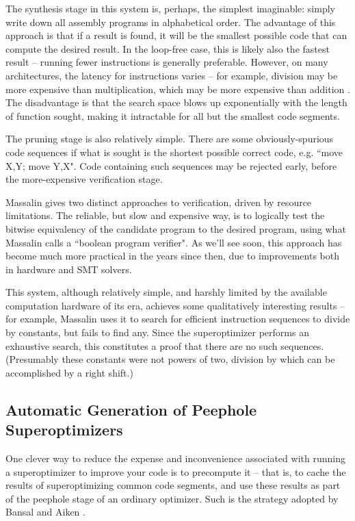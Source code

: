 \documentclass[12pt,twoside]{reedthesis}
\begin{document}
            The synthesis stage in this system is, perhaps, the simplest imaginable: simply write down all assembly programs in alphabetical order.
            The advantage of this approach is that if a result is found, it will be the smallest possible code that can compute the desired result.
            In the loop-free case, this is likely also the fastest result -- running fewer instructions is generally preferable.
            However, on many architectures, the latency for instructions varies -- for example, division may be more expensive than multiplication, which may be more expensive than addition \cite{fog2022instructiontables}.
            The disadvantage is that the search space blows up exponentially with the length of function sought, making it intractable for all but the smallest code segments.
                
            The pruning stage is also relatively simple.
            There are some obviously-spurious code sequences if what is sought is the shortest possible correct code, e.g. ``move X,Y; move Y,X".
            Code containing such sequences may be rejected early, before the more-expensive verification stage.
                
            Massalin gives two distinct approaches to verification, driven by resource limitations.
            The reliable, but slow and expensive way, is to logically test the bitwise equivalency of the candidate program to the desired program, using what Massalin calls a ``boolean program verifier".
            As we'll see soon, this approach has become much more practical in the years since then, due to improvements both in hardware and SMT solvers. 
                
            This system, although relatively simple, and harshly limited by the available computation hardware of its era, achieves some qualitatively interesting results -- for example, Massalin uses it to search for efficient instruction sequences to divide by constants, but fails to find any.
            Since the superoptimizer performs an exhaustive search, this constitutes a proof that there are no such sequences. (Presumably these constants were not powers of two, division by which can be accomplished by a right shift.)

        \subsection{Automatic Generation of Peephole Superoptimizers}
            One clever way to reduce the expense and inconvenience associated with running a superoptimizer to improve your code is to precompute it
            -- that is, to cache the results of superoptimizing common code segments, and use these results as part of the peephole stage of an ordinary optimizer.
            Such is the strategy adopted by Bansal and Aiken \cite{bansal2006peephole}.
            
\end{document}
